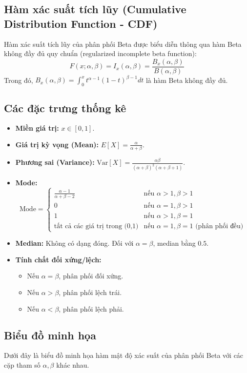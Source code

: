 	\subsection{Hàm xác suất tích lũy (Cumulative Distribution Function - CDF)}
	Hàm xác suất tích lũy của phân phối Beta được biểu diễn thông qua hàm Beta không đầy đủ quy chuẩn (regularized incomplete beta function):
	\[ F(x; \alpha, \beta) = I_x(\alpha, \beta) = \frac{B_x(\alpha, \beta)}{B(\alpha, \beta)} \]
	Trong đó, $B_x(\alpha, \beta) = \int_0^x t^{\alpha-1}(1-t)^{\beta-1} dt$ là hàm Beta không đầy đủ.
	
	\subsection{Các đặc trưng thống kê}
	\begin{itemize}[leftmargin=*]
		\item \textbf{Miền giá trị:} $x \in [0, 1]$.
		\item \textbf{Giá trị kỳ vọng (Mean):} $E[X] = \frac{\alpha}{\alpha+\beta}$.
		\item \textbf{Phương sai (Variance):} $\text{Var}[X] = \frac{\alpha\beta}{(\alpha+\beta)^2(\alpha+\beta+1)}$.
		\item \textbf{Mode:}
		\[ \text{Mode} = \begin{cases} \frac{\alpha-1}{\alpha+\beta-2} & \text{nếu } \alpha > 1, \beta > 1 \\ 0 & \text{nếu } \alpha=1, \beta > 1 \\ 1 & \text{nếu } \alpha > 1, \beta=1 \\ \text{tất cả các giá trị trong (0,1)} & \text{nếu } \alpha=1, \beta=1 \text{ (phân phối đều)} \end{cases} \]
		\item \textbf{Median:} Không có dạng đóng. Đối với $\alpha = \beta$, median bằng $0.5$.
		\item \textbf{Tính chất đối xứng/lệch:}
		\begin{itemize}
			\item Nếu $\alpha = \beta$, phân phối đối xứng.
			\item Nếu $\alpha > \beta$, phân phối lệch trái.
			\item Nếu $\alpha < \beta$, phân phối lệch phải.
		\end{itemize}
	\end{itemize}
	
	\subsection{Biểu đồ minh họa}
	Dưới đây là biểu đồ minh họa hàm mật độ xác suất của phân phối Beta với các cặp tham số $\alpha, \beta$ khác nhau.
	
